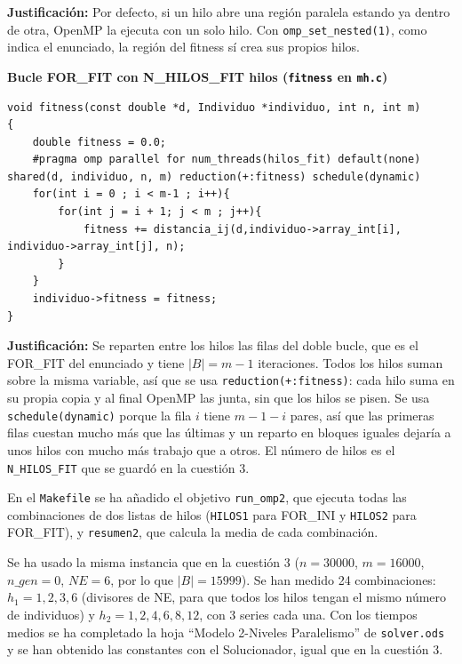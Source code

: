 \documentclass[12pt]{article}
\begin{document}
\begin{enumerate}
\textbf{Justificación:} Por defecto, si un hilo abre una región paralela estando ya dentro de otra, OpenMP la ejecuta con un solo hilo. Con \texttt{omp\_set\_nested(1)}, como indica el enunciado, la región del fitness sí crea sus propios hilos.

\vspace{0.5cm}

\medskip
\noindent\textbf{Bucle FOR\_FIT con N\_HILOS\_FIT hilos (\texttt{fitness} en \texttt{mh.c})}\par
\smallskip

\begin{lstlisting}[style=EstiloC]
void fitness(const double *d, Individuo *individuo, int n, int m)
{
    double fitness = 0.0;
    #pragma omp parallel for num_threads(hilos_fit) default(none) shared(d, individuo, n, m) reduction(+:fitness) schedule(dynamic)
    for(int i = 0 ; i < m-1 ; i++){
        for(int j = i + 1; j < m ; j++){
            fitness += distancia_ij(d,individuo->array_int[i], individuo->array_int[j], n);
        }
    }
    individuo->fitness = fitness;
}
\end{lstlisting}

\textbf{Justificación:} Se reparten entre los hilos las filas del doble bucle, que es el FOR\_FIT del enunciado y tiene $|B| = m-1$ iteraciones. Todos los hilos suman sobre la misma variable, así que se usa \texttt{reduction(+:fitness)}: cada hilo suma en su propia copia y al final OpenMP las junta, sin que los hilos se pisen. Se usa \texttt{schedule(dynamic)} porque la fila $i$ tiene $m-1-i$ pares, así que las primeras filas cuestan mucho más que las últimas y un reparto en bloques iguales dejaría a unos hilos con mucho más trabajo que a otros. El número de hilos es el \texttt{N\_HILOS\_FIT} que se guardó en la cuestión 3.

\vspace{0.5cm}

En el \texttt{Makefile} se ha añadido el objetivo \texttt{run\_omp2}, que ejecuta todas las combinaciones de dos listas de hilos (\texttt{HILOS1} para FOR\_INI y \texttt{HILOS2} para FOR\_FIT), y \texttt{resumen2}, que calcula la media de cada combinación.

Se ha usado la misma instancia que en la cuestión 3 ($n = 30000$, $m = 16000$, $n\_gen = 0$, $NE = 6$, por lo que $|B| = 15999$). Se han medido 24 combinaciones: $h_1 = 1, 2, 3, 6$ (divisores de NE, para que todos los hilos tengan el mismo número de individuos) y $h_2 = 1, 2, 4, 6, 8, 12$, con 3 series cada una. Con los tiempos medios se ha completado la hoja ``Modelo 2-Niveles Paralelismo'' de \texttt{solver.ods} y se han obtenido las constantes con el Solucionador, igual que en la cuestión 3.


\end{enumerate}
\end{document}
